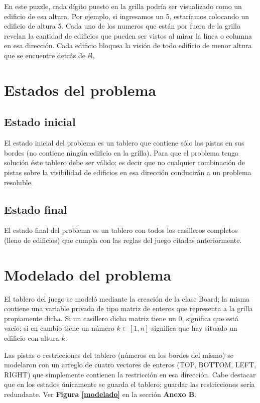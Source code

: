 \documentclass[%
	final,
	reprint,
	notitlepage,
	narroweqnarray,
	inline,
	twoside,
	invited
	]{ieee}
\begin{document}
\par En este puzzle, cada dígito puesto en la grilla podría ser visualizado como un edificio de esa altura. Por ejemplo, si ingresamos un 5, estaríamos colocando un edificio de altura 5. Cada uno de los numeros que están por fuera de la grilla revelan la cantidad de edificios que pueden ser vistos al mirar la línea o columna en esa dirección. Cada edificio bloquea la visión de todo edificio de menor altura que se encuentre detrás de él.


\section{Estados del problema}

\subsection{Estado inicial}

\par El estado inicial del problema es un tablero que contiene sólo las pistas en sus bordes (no contiene ningún edificio en la grilla). Para que el problema tenga solución éste tablero debe ser válido; es decir que no cualquier combinación de pistas sobre la visibilidad de edificios en esa dirección conducirán a un problema resoluble.

\subsection{Estado final}

\par El estado final del problema es un tablero con todos los casilleros completos (lleno de edificios) que cumpla con las reglas del juego citadas anteriormente.

\section{Modelado del problema}

\par El tablero del juego se modeló mediante la creación de la clase Board; la misma contiene una variable privada de tipo matriz de enteros que representa a la grilla propiamente dicha. Si un casillero dicha matriz  tiene un $0$, significa que  está vacío; si en cambio tiene un número $k \in [1,n]$ significa que hay situado un edificio con altura $k$.\\
\par Las pistas o restricciones del tablero (números en los bordes del mismo) se modelaron con un arreglo de cuatro vectores de enteros (TOP, BOTTOM, LEFT, RIGHT) que simplemente contienen la restricción en esa dirección.
Cabe destacar que en los estados únicamente se guarda el tablero; guardar las restricciones sería redundante. Ver \textbf{Figura \ref{modelado}} en la sección \textbf{Anexo B}.\\
\end{document}
